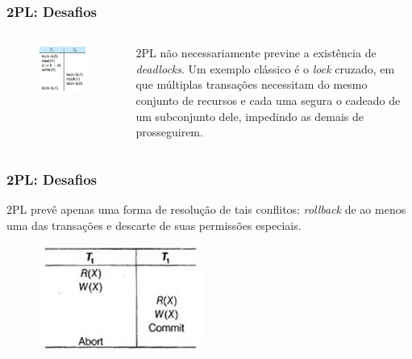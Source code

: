 \documentclass{beamer}
\begin{document}

\begin{frame} %
    \frametitle{2PL: Desafios}

    \begin{columns}[c] %
    
            \begin{figure}
                \includegraphics[width=0.8\linewidth]{example6.png}
            \end{figure}
        
        
        2PL não necessariamente previne a existência de \emph{deadlocks}. Um exemplo clássico é o \emph{lock} cruzado, em que múltiplas transações necessitam do mesmo conjunto de recursos e cada uma segura o cadeado de um subconjunto dele, impedindo as demais de prosseguirem.
    \end{columns}
    
\end{frame}


\begin{frame} %
    \frametitle{2PL: Desafios}

    \medskip
    2PL prevê apenas uma forma de resolução de tais conflitos: \emph{rollback} de ao menos uma das transações e descarte de suas permissões especiais.

    \medskip
    \medskip
    \begin{figure}
        \includegraphics[width=0.4\linewidth]{example7.jpg}
    \end{figure}
\end{frame}
\end{document}
